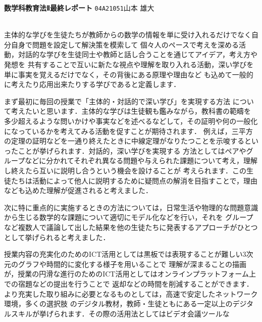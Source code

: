 \documentclass{ltjsarticle}
\begin{document}
{\textbf{\LARGE{数学科教育法Ⅱ最終レポート}}}\hspace{\fill} {\texttt{\Large{04A21051}}}{\Large{山本 雄大}}\\\\
\par 
主体的な学びを生徒たちが教師からの数学の情報を単に受け入れるだけでなく自分自身で問題を設定して解決策を模索して
個々人のペースで考えを深める活動，対話的な学びを生徒同士や教師と話し合うことを通じてアイデア，考え方や発想を
共有することで互いに新たな視点や理解を取り入れる活動，深い学びを単に事実を覚えるだけでなく，その背後にある原理や理由など
も込めて一般的に考えたり応用出来たりする学びであると定義します．\par
まず最初に毎回の授業で「主体的・対話的で深い学び」を実現する方法
について考えたいと思います．主体的な学びは生徒観も鑑みながら，教科書の範疇を
多少超えるような問いかけや事実などを述べるなどして，その証明や何の一般化になっているかを考えてみる活動を促すことが期待されます．
例えば，三平方の定理の証明などを一通り終えたときに中線定理がなりたつことを示唆するといったことが挙げられます．対話的，深い学びを実現する
方法としてはペアやグループなどに分かれてそれぞれ異なる問題や与えられた課題について考え，理解し終えたら互いに説明し合うという機会を設けることが
考えられます．この生徒たちは活動によって他人に説明するために疑問点の解消を目指すことで，理由なども込めた理解が促進されると考えました．\par
次に特に重点的に実施するときの方法については，日常生活や物理的な問題意識から生じる数学的な課題について適切にモデル化などを行い，それを
グループなど複数人で議論して出した結果を他の生徒たちに発表するアプローチがひとつとして挙げられると考えました．\par
授業内容の充実化のためのICT活用としては黒板では表現することが難しい3次元のグラフや時間的に変化する様子を用いることで
理解が深まることの描画が，授業の円滑な進行のためのICT活用としてはオンラインプラットフォーム上での宿題などの提出を行うことで
返却などの時間を削減することができます．より充実した取り組みに必要となるものとしては，高速で安定したネットワーク環境，多くの選択肢
のデジタル教材，教師・生徒ともにある一定以上のデジタルスキルが挙げられます．その際の活用法としてはビデオ会議ツールな
\end{document}
